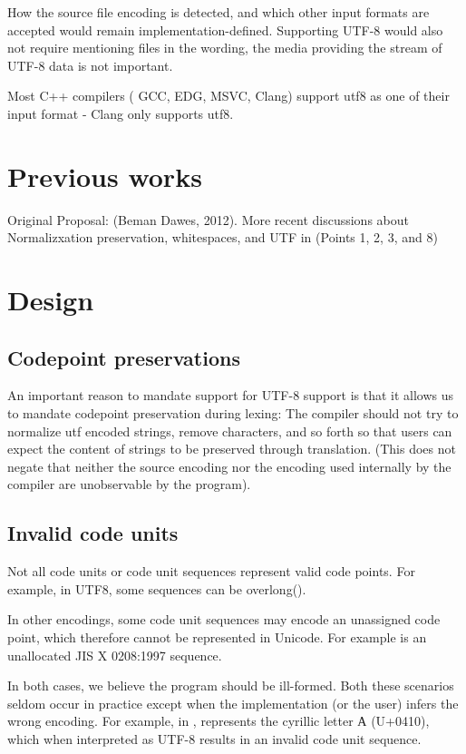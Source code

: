 \documentclass{wg21}
\begin{document}
How the source file encoding is detected, and which other input formats are accepted would remain implementation-defined.
Supporting UTF-8 would also not require mentioning files in the wording, the media providing the stream of UTF-8 data is not important.

Most C++ compilers ( GCC, EDG, MSVC, Clang) support utf8 as one of their input format - Clang only supports utf8.

\section{Previous works}

Original Proposal:  (Beman Dawes, 2012).
More recent discussions about Normalizxation preservation, whitespaces, and UTF in  (Points 1, 2, 3, and 8)

\section{Design}

\subsection{Codepoint preservations}

An important reason to mandate support for UTF-8 support is that it allows us to mandate codepoint preservation during lexing:
The compiler should not try to normalize utf encoded strings, remove characters, and so forth so that users can expect the content
of strings to be preserved through translation.
(This does not negate that neither the source encoding nor the encoding used internally by the compiler are unobservable by the program).

\subsection{Invalid code units}

Not all code units or code unit sequences represent valid code points.
For example, in UTF8, some sequences can be overlong().

In other encodings, some code unit sequences may encode an unassigned code point, which therefore cannot be represented in Unicode.
For example  is an unallocated JIS X 0208:1997 sequence.

In both cases, we believe the program should be ill-formed.
Both these scenarios seldom occur in practice except when the implementation (or the user) infers the wrong encoding.
For example, in ,  represents the cyrillic letter А (U+0410), which when interpreted
as UTF-8 results in an invalid code unit sequence.
\end{document}
